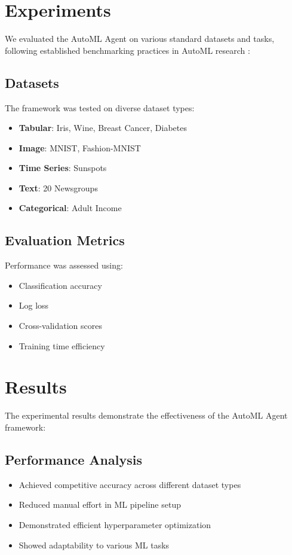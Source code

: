 \documentclass[11pt]{article}
\begin{document}
\section{Experiments}
We evaluated the AutoML Agent on various standard datasets and tasks, following established benchmarking practices in AutoML research \citep{automl_survey}:

\subsection{Datasets}
The framework was tested on diverse dataset types:
\begin{itemize}
    \item \textbf{Tabular}: Iris, Wine, Breast Cancer, Diabetes
    \item \textbf{Image}: MNIST, Fashion-MNIST
    \item \textbf{Time Series}: Sunspots
    \item \textbf{Text}: 20 Newsgroups
    \item \textbf{Categorical}: Adult Income
\end{itemize}

\subsection{Evaluation Metrics}
Performance was assessed using:
\begin{itemize}
    \item Classification accuracy
    \item Log loss
    \item Cross-validation scores
    \item Training time efficiency
\end{itemize}

\section{Results}
The experimental results demonstrate the effectiveness of the AutoML Agent framework:

\subsection{Performance Analysis}
\begin{itemize}
    \item Achieved competitive accuracy across different dataset types
    \item Reduced manual effort in ML pipeline setup
    \item Demonstrated efficient hyperparameter optimization
    \item Showed adaptability to various ML tasks
\end{itemize}
\end{document}
